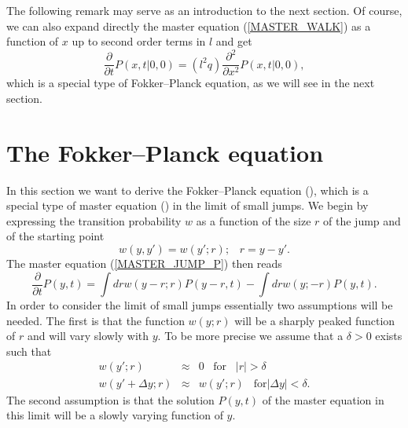 The following remark may serve as an introduction to the next 
section. Of course, we can also expand directly the master equation
(\ref{MASTER_WALK}) as a function of $x$ up to second order terms 
in $l$ and get
\begin{equation*}
\frac{\partial}{\partial t} P(x,t|0,0) =
     (l^2q) \frac{\partial^2}{\partial x^2} P(x,t|0,0),
\end{equation*}
which is a special type of Fokker--Planck equation, as we will see 
in the next section.

\section{The Fokker--Planck equation}
In this section we want to derive the Fokker--Planck equation
(\cite{RISKEN}),
which is a special type of master equation (\cite{VAN_KAMPEN})
in the limit of small jumps.
We begin by expressing the transition probability $w$ as a 
function of the size $r$ of the jump and of the starting point
\begin{equation*}
w(y,y') = w(y';r); \;\;\; r=y-y'.
\end{equation*}
The master equation (\ref{MASTER_JUMP_P}) then reads
\begin{equation}
\label{MASTER_SMALL_JUMP}
\frac{\partial}{\partial t} P(y,t) =
  \int dr w(y-r;r)P(y-r,t) - \int dr w(y;-r)P(y,t).
\end{equation}
In order to consider the limit of small jumps essentially
two assumptions will be needed. The first is that
the function
$w(y;r)$ will be a sharply peaked function of $r$ and will
vary slowly with $y$. To be more precise we assume that a $\delta >0$
exists such that
\begin{eqnarray*}
w(y';r)  & \approx & 0 \;\;\; \text{for} \;\;\; |r|> \delta \\
w(y'+\Delta y;r) & \approx & w(y';r) \;\;\; \text{for} |\Delta y| < 
\delta.
\end{eqnarray*}
The second assumption is that the solution $P(y,t)$ of the master equation 
in this limit will be a slowly varying function of $y$.

